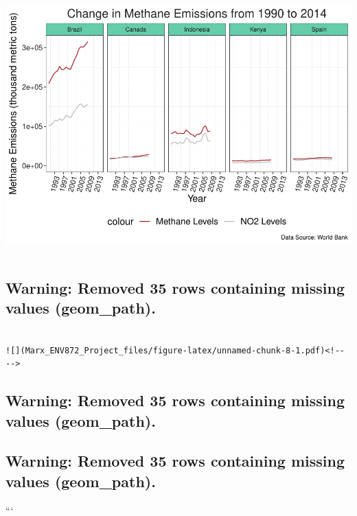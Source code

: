 \documentclass[12pt,]{article}
\begin{document}
\includegraphics{Marx_ENV872_Project_files/figure-latex/unnamed-chunk-7-1.pdf}

\begin{verbatim}

\end{verbatim}

\subsection{Warning: Removed 35 rows containing missing values
(geom\_path).}\label{warning-removed-35-rows-containing-missing-values-geom_path.}

\begin{verbatim}

![](Marx_ENV872_Project_files/figure-latex/unnamed-chunk-8-1.pdf)<!-- --> 

\end{verbatim}

\subsection{Warning: Removed 35 rows containing missing values
(geom\_path).}\label{warning-removed-35-rows-containing-missing-values-geom_path.-1}

\subsection{Warning: Removed 35 rows containing missing values
(geom\_path).}\label{warning-removed-35-rows-containing-missing-values-geom_path.-2}

```
\end{document}
